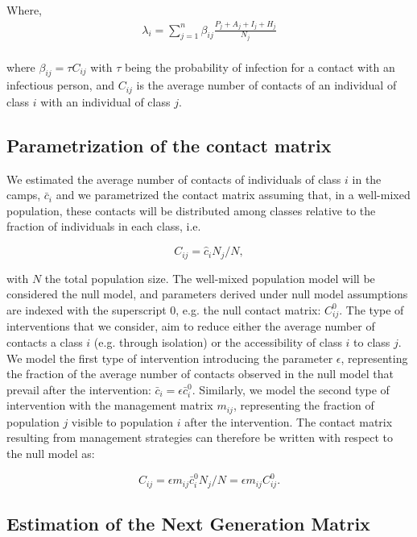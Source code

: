 \documentclass{article}
\begin{document}
Where, 
\\
\begin{gather}
   \lambda_i = \sum_{j = 1}^n \beta_{ij} \frac{P_j + A_j + I_j + H_j}{N_j}
\end{gather}
\\

where $\beta_{ij}=\tau C_{ij}$ with $\tau$ being the probability of infection for a contact with an infectious person, and $C_{ij}$ is the average number of contacts of an individual of class $i$ with an individual of class $j$. 

\subsection*{Parametrization of the contact matrix}

We estimated the average number of contacts of individuals of class $i$ in the camps, $\bar{c}_i$ and we parametrized the contact matrix assuming that, in a well-mixed population, these contacts will be distributed among classes relative to the fraction of individuals in each class, i.e.

\begin{equation}
C_{ij} = \hat{c}_i N_j/N,
\end{equation}

with $N$ the total population size. The well-mixed population model will be considered the null model, and parameters derived under null model assumptions are indexed with the superscript $0$, e.g. the null contact matrix: $C^0_{ij}$. The type of interventions that we consider, aim to reduce either the average number of contacts a class $i$ (e.g. through isolation) or the accessibility of class $i$ to class $j$. We model the first type of intervention introducing the parameter $\epsilon$, representing the fraction of the average number of contacts observed in the null model that prevail after the intervention: $\bar{c}_i = \epsilon \bar{c}^0_i$. Similarly, we model the second type of intervention with the management matrix $m_{ij}$, representing the fraction of population $j$ visible to population $i$ after the intervention. The contact matrix resulting from management strategies can therefore be written with respect to the null model as:

\begin{equation}
C_{ij} =\epsilon m_{ij} \bar{c}^0_i N_j/N = \epsilon m_{ij} C^0_{ij}.
\end{equation}

\subsection*{Estimation of the Next Generation Matrix}
\end{document}
